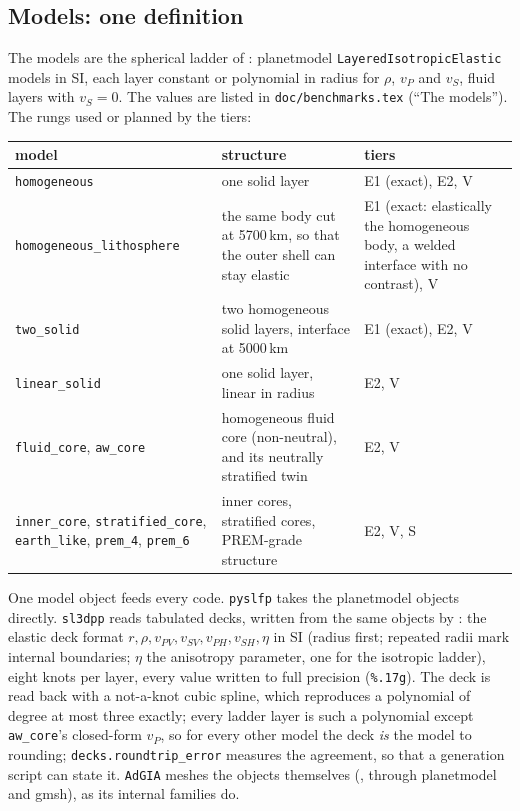 \documentclass[11pt]{article}
\numberwithin{equation}{section}
\newcommand{\code}[1]{\texttt{#1}}
\begin{document}
\subsection{Models: one definition}
\label{sec:models}

The models are the spherical ladder of :
planetmodel \code{LayeredIsotropicElastic} models in SI, each layer
constant or polynomial in radius for $\rho$, $v_P$ and $v_S$, fluid layers
with $v_S=0$. The values are listed in \code{doc/benchmarks.tex} (``The
models''). The rungs used or planned by the tiers:
\begin{center}
\small
\begin{tabular}{@{}P{4.2cm}P{5.4cm}P{5.4cm}@{}}
\toprule
model & structure & tiers \\
\midrule
\code{homogeneous} & one solid layer & E1 (exact), E2, V \\
\code{homogeneous\_lithosphere} & the same body cut at 5700\,km, so that
the outer shell can stay elastic & E1 (exact: elastically the homogeneous
body, a welded interface with no contrast), V \\
\code{two\_solid} & two homogeneous solid layers, interface at 5000\,km &
E1 (exact), E2, V \\
\code{linear\_solid} & one solid layer, linear in radius & E2, V \\
\code{fluid\_core}, \code{aw\_core} & homogeneous fluid core (non-neutral),
and its neutrally stratified twin & E2, V \\
\code{inner\_core}, \code{stratified\_core}, \code{earth\_like},
\code{prem\_4}, \code{prem\_6} & inner cores, stratified cores, PREM-grade
structure & E2, V, S \\
\bottomrule
\end{tabular}
\end{center}

One model object feeds every code. \code{pyslfp} takes the planetmodel
objects directly. \code{sl3dpp} reads tabulated decks, written from the same
objects by : the elastic deck format
$r,\rho,v_{PV},v_{SV},v_{PH},v_{SH},\eta$ in SI (radius first; repeated
radii mark internal boundaries; $\eta$ the anisotropy parameter, one for
the isotropic ladder), eight knots per layer, every value written to full
precision (\code{\%.17g}). The deck is read back with a not-a-knot cubic
spline, which reproduces a polynomial of degree at most three exactly; every
ladder layer is such a polynomial except \code{aw\_core}'s closed-form
$v_P$, so for every other model the deck \emph{is} the model to rounding;
\code{decks.roundtrip\_error} measures the agreement, so that a generation
script can state it. \code{AdGIA} meshes the objects themselves
(, through planetmodel and gmsh), as
its internal families do.
\end{document}

